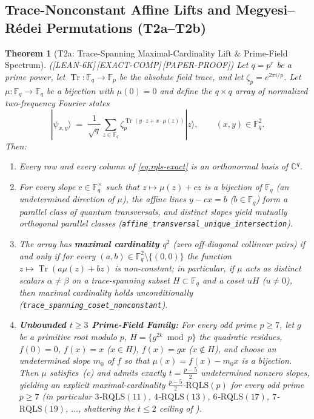\documentclass[11pt,reqno]{amsart}
\newtheorem{theorem}{Theorem}[section]
\theoremstyle{definition}
\newcommand{\FF}{\mathbb{F}}
\newcommand{\CC}{\mathbb{C}}
\newcommand{\Tr}{\operatorname{Tr}}
\newcommand{\RQLS}{\mathrm{RQLS}}
\newcommand{\lid}[1]{{\footnotesize\nolinkurl{#1}}}
\newcommand{\tagL}{\textsf{\footnotesize[LEAN-6K]}}
\newcommand{\tagE}{\textsf{\footnotesize[EXACT-COMP]}}
\newcommand{\tagP}{\textsf{\footnotesize[PAPER-PROOF]}}
\begin{document}
\subsection{Trace-Nonconstant Affine Lifts and Megyesi--R\'edei Permutations (T2a--T2b)}

\begin{theorem}[T2a: Trace-Spanning Maximal-Cardinality Lift \& Prime-Field Spectrum]
\label{thm:t2a}
\textup{(\tagL\,\tagE\,\tagP)}
Let $q = p^r$ be a prime power, let $\Tr : \FF_q \to \FF_p$ be the absolute field trace,
and let $\zeta_p = e^{2\pi i/p}$. Let $\mu : \FF_q \to \FF_q$ be a bijection with
$\mu(0) = 0$ and define the $q \times q$ array of normalized two-frequency Fourier states
\begin{equation}
  \label{eq:rqls-exact}
  |\psi_{x,y}\rangle \;=\; \frac{1}{\sqrt{q}} \sum_{z \in \FF_q}
    \zeta_p^{\Tr(y \cdot z + x \cdot \mu(z))} |z\rangle, \qquad (x, y) \in \FF_q^2.
\end{equation}
Then:
\begin{enumerate}[label=(\alph*)]
  \item Every row and every column of \eqref{eq:rqls-exact} is an orthonormal basis of
    $\CC^q$.
  \item For every slope $c \in \FF_q^\times$ such that $z \mapsto \mu(z) + cz$ is a
    bijection of $\FF_q$ (an \emph{undetermined direction} of $\mu$), the affine lines
    $y - cx = b$ ($b \in \FF_q$) form a parallel class of quantum transversals, and
    distinct slopes yield mutually orthogonal parallel classes
    (\lid{affine_transversal_unique_intersection}).
  \item The array has \textbf{maximal cardinality $q^2$} (zero off-diagonal collinear
    pairs) if and only if for every $(a, b) \in \FF_q^2 \setminus \{(0,0)\}$ the function
    $z \mapsto \Tr(a\mu(z)+bz)$ is non-constant; in particular, if $\mu$ acts as distinct
    scalars $\alpha \ne \beta$ on a trace-spanning subset $H \subset \FF_q$ and a coset
    $uH$ ($u \ne 0$), then maximal cardinality holds unconditionally
    (\lid{trace_spanning_coset_nonconstant}).
  \item \textbf{Unbounded $t \ge 3$ Prime-Field Family:} For every odd prime $p \ge 7$,
    let $g$ be a primitive root modulo $p$, $H = \{g^{2k} \bmod p\}$ the quadratic
    residues, $f(0) = 0$, $f(x) = x$ ($x \in H$), $f(x) = gx$ ($x \notin H$), and choose
    an undetermined slope $m_0$ of $f$ so that $\mu(x) = f(x) - m_0 x$ is a bijection.
    Then $\mu$ satisfies~(c) and admits exactly $t = \frac{p-5}{2}$ undetermined nonzero
    slopes, yielding an explicit maximal-cardinality $\frac{p-5}{2}$-$\RQLS(p)$ for every
    odd prime $p \ge 7$ (in particular $3$-$\RQLS(11)$, $4$-$\RQLS(13)$, $6$-$\RQLS(17)$,
    $7$-$\RQLS(19)$, $\dots$, shattering the $t \le 2$ ceiling of \cite{zhang2026rqls}).
\end{enumerate}
\end{theorem}
\end{document}

